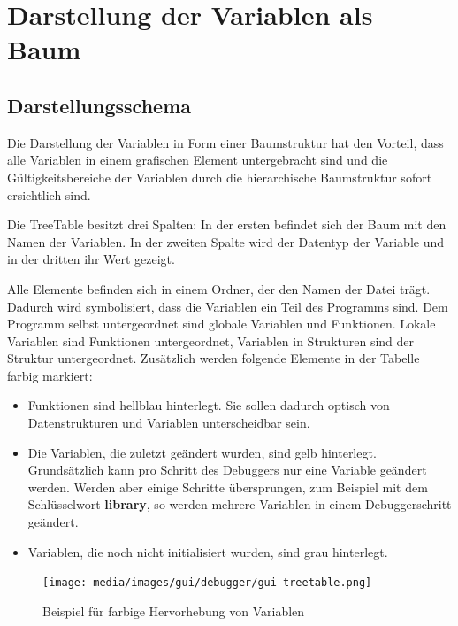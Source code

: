 \section{Darstellung der Variablen als Baum}

\subsection{Darstellungsschema}

Die Darstellung der Variablen in Form einer Baumstruktur hat den Vorteil, dass alle Variablen in einem grafischen Element untergebracht sind und die Gültigkeitsbereiche der Variablen durch die hierarchische Baumstruktur sofort ersichtlich sind.

Die TreeTable besitzt drei Spalten: In der ersten befindet sich der Baum mit den Namen der Variablen. In der zweiten Spalte wird der Datentyp der Variable und in der dritten ihr Wert gezeigt.

Alle Elemente befinden sich in einem Ordner, der den Namen der Datei trägt. Dadurch wird symbolisiert, dass die Variablen ein Teil des Programms sind. Dem Programm selbst untergeordnet sind globale Variablen und Funktionen. Lokale Variablen sind Funktionen untergeordnet, Variablen in Strukturen sind der Struktur untergeordnet.
Zusätzlich werden folgende Elemente in der Tabelle farbig markiert:
\begin{itemize}
\item Funktionen sind hellblau hinterlegt. Sie sollen dadurch optisch von Datenstrukturen und Variablen unterscheidbar sein.
\item Die Variablen, die zuletzt geändert wurden, sind gelb hinterlegt. Grundsätzlich kann pro Schritt des Debuggers nur eine Variable geändert werden. Werden aber einige Schritte übersprungen, zum Beispiel mit dem Schlüsselwort \textbf{library}, so werden mehrere Variablen in einem Debuggerschritt geändert.
\item Variablen, die noch nicht initialisiert wurden, sind grau hinterlegt.
\end{itemize}

\begin{figure}[htp]
\centering
\texttt{[image: media/images/gui/debugger/gui-treetable.png]}
\caption{Beispiel für farbige Hervorhebung von Variablen}
\label{fig:deb-tt-example}
\end{figure}

